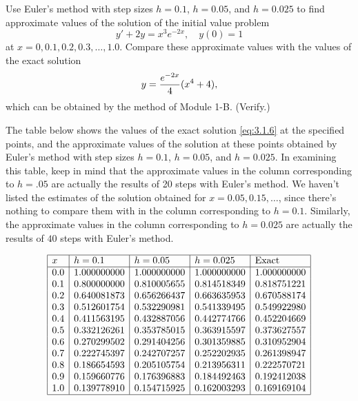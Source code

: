 \documentclass{ximera}
\begin{document}
\begin{example}\label{example:3.1.2}
Use Euler's method with step sizes $h=0.1$, $h=0.05$, and $h=0.025$ to
find approximate values of the solution of the initial value problem
$$
y'+2y=x^3e^{-2x},\quad y(0)=1
$$
at $x=0, 0.1, 0.2, 0.3, \ldots, 1.0$. Compare these approximate
values
with the values of the exact solution
\begin{equation} \label{eq:3.1.6}
y={e^{-2x}\over4}(x^4+4),
\end{equation}
which can be obtained by the method of Module 1-B. (Verify.)



\begin{explanation}
The table below shows the values of the exact solution
\eqref{eq:3.1.6} at the specified points, and the approximate values of
the solution at these points obtained by Euler's method with step
sizes $h=0.1$, $h=0.05$, and $h=0.025$. In examining this table, keep
in mind that the approximate values in the column corresponding to
$h=.05$ are actually the results of 20 steps with Euler's method. We
haven't listed the estimates of the solution obtained for
$x=0.05, 0.15, \dots $, since there's nothing to compare them with in
the column corresponding to $h=0.1$. Similarly, the approximate values
in the column corresponding to $h=0.025$ are actually the results of
$40$ steps with Euler's method.


$$
\begin{array}{|l|l|l|l|l|}
\hline
x & h=0.1 & h=0.05 & h=0.025 & \text{Exact}\\ \hline
0.0 & 1.000000000 & 1.000000000 & 1.000000000 & 1.000000000 \\
0.1 & 0.800000000 & 0.810005655 & 0.814518349 & 0.818751221 \\
0.2 & 0.640081873 & 0.656266437 & 0.663635953 & 0.670588174 \\
0.3 & 0.512601754 & 0.532290981 & 0.541339495 & 0.549922980 \\
0.4 & 0.411563195 & 0.432887056 & 0.442774766 & 0.452204669 \\
0.5 & 0.332126261 & 0.353785015 & 0.363915597 & 0.373627557 \\
0.6 & 0.270299502 & 0.291404256 & 0.301359885 & 0.310952904 \\
0.7 & 0.222745397 & 0.242707257 & 0.252202935 & 0.261398947 \\
0.8 & 0.186654593 & 0.205105754 & 0.213956311 & 0.222570721 \\
0.9 & 0.159660776 & 0.176396883 & 0.184492463 & 0.192412038 \\
1.0 & 0.139778910 & 0.154715925 & 0.162003293 & 0.169169104\\
\hline
\end{array}
$$


\end{explanation}
\end{example}
\end{document}
